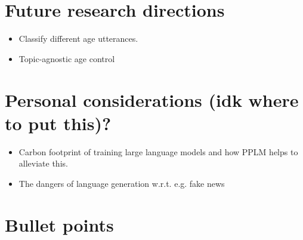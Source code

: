 \section{Future research directions}

\begin{itemize}
    \item Classify different age utterances.
\end{itemize}

\begin{itemize}
    \item Topic-agnostic age control
\end{itemize}

\section{Personal considerations (idk where to put this)?}

\begin{itemize}
    \item Carbon footprint of training large language models and how PPLM helps to alleviate this.
    \item The dangers of language generation w.r.t. e.g. fake news
\end{itemize}

\section{Bullet points}

